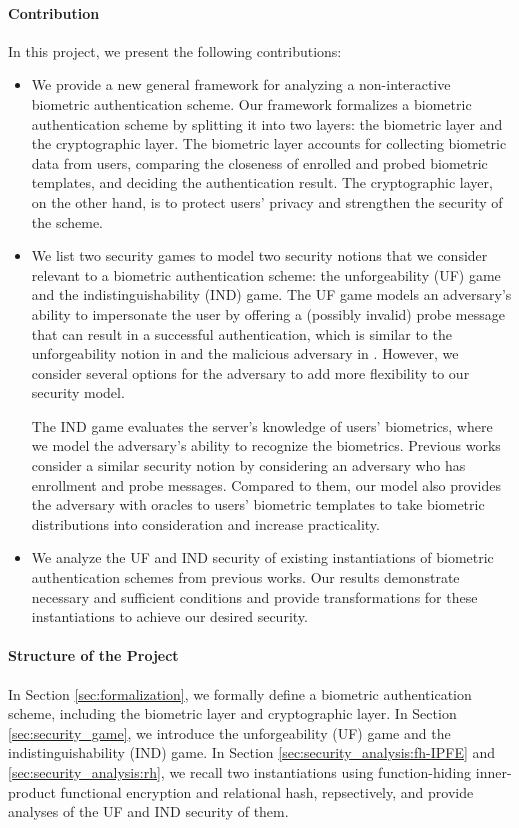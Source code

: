 \paragraph{Contribution}
In this project, we present the following contributions:
\begin{itemize}
	\item We provide a new general framework for analyzing a non-interactive biometric authentication scheme. Our framework formalizes a biometric authentication scheme by splitting it into two layers: the biometric layer and the cryptographic layer. The biometric layer accounts for collecting biometric data from users, comparing the closeness of enrolled and probed biometric templates, and deciding the authentication result. The cryptographic layer, on the other hand, is to protect users' privacy and strengthen the security of the scheme.
	\item We list two security games to model two security notions that we consider relevant to a biometric authentication scheme: the unforgeability (UF) game and the indistinguishability (IND) game. The UF game models an adversary's ability to impersonate the user by offering a (possibly invalid) probe message that can result in a successful authentication, which is similar to the unforgeability notion in \cite{cryptoeprint:2014/394} and the malicious adversary in \cite{cryptoeprint:2023/481}. However, we consider several options for the adversary to add more flexibility to our security model.

	The IND game evaluates the server's knowledge of users' biometrics, where we model the adversary's ability to recognize the biometrics. Previous works \cite{cryptoeprint:2014/394, cryptoeprint:2018/1214, 10.1007/978-3-030-90567-5_33, cryptoeprint:2023/481} consider a similar security notion by considering an adversary who has enrollment and probe messages. Compared to them, our model also provides the adversary with oracles to users' biometric templates to take biometric distributions into consideration and increase practicality.
	
	\item We analyze the UF and IND security of existing instantiations of biometric authentication schemes from previous works. Our results demonstrate necessary and sufficient conditions and provide transformations for these instantiations to achieve our desired security.
\end{itemize}

\paragraph{Structure of the Project}
In Section \ref{sec:formalization}, we formally define a biometric authentication scheme, including the biometric layer and cryptographic layer. 
In Section \ref{sec:security_game}, we introduce the unforgeability (UF) game and the indistinguishability (IND) game. 
In Section \ref{sec:security_analysis:fh-IPFE} and \ref{sec:security_analysis:rh}, we recall two instantiations using function-hiding inner-product functional encryption and relational hash, repsectively, and provide analyses of the UF and IND security of them.

